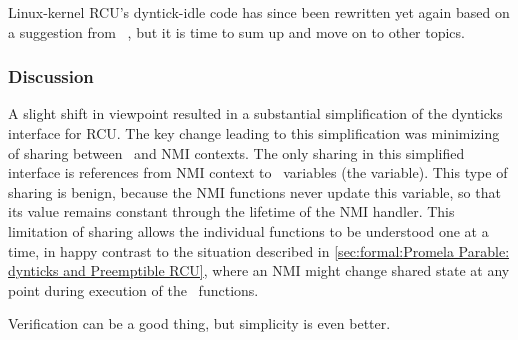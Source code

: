 \QuickQuizEnd

Linux-kernel RCU's dyntick-idle code has since been rewritten yet again
based on a suggestion from
~\cite{PaulMcKenney2015dyntickAndyNMI},
but it is time to sum up and move on to other topics.

\subsubsection{Discussion}
\label{sec:formal:Discussion}

A slight shift in viewpoint resulted in a substantial simplification
of the dynticks interface for RCU\@.
The key change leading to this simplification was minimizing of
sharing between \IRQ\ and NMI contexts.
The only sharing in this simplified interface is references from NMI
context to \IRQ\ variables (the  variable).
This type of sharing is benign, because the NMI functions never update
this variable, so that its value remains constant through the lifetime
of the NMI handler.
This limitation of sharing allows the individual functions to be
understood one at a time, in happy contrast to the situation
described in
\cref{sec:formal:Promela Parable: dynticks and Preemptible RCU},
where an NMI might change shared state at any point during execution of
the \IRQ\ functions.

Verification can be a good thing, but simplicity is even better.

